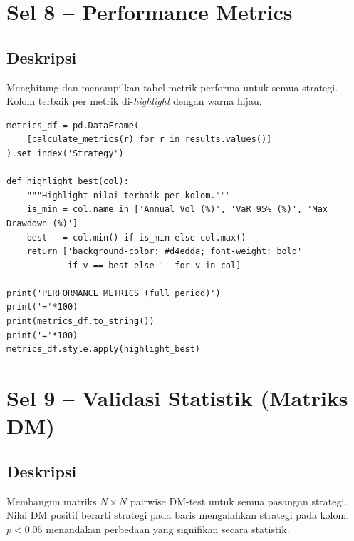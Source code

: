 \documentclass[12pt,a4paper]{article}
\begin{document}
\section{Sel 8 -- Performance Metrics}

\subsection{Deskripsi}
Menghitung dan menampilkan tabel metrik performa untuk semua strategi. Kolom
terbaik per metrik di-\textit{highlight} dengan warna hijau.

\begin{lstlisting}[caption={Tampilkan tabel metrik}]
metrics_df = pd.DataFrame(
    [calculate_metrics(r) for r in results.values()]
).set_index('Strategy')

def highlight_best(col):
    """Highlight nilai terbaik per kolom."""
    is_min = col.name in ['Annual Vol (%)', 'VaR 95% (%)', 'Max Drawdown (%)']
    best   = col.min() if is_min else col.max()
    return ['background-color: #d4edda; font-weight: bold'
            if v == best else '' for v in col]

print('PERFORMANCE METRICS (full period)')
print('='*100)
print(metrics_df.to_string())
print('='*100)
metrics_df.style.apply(highlight_best)
\end{lstlisting}

\section{Sel 9 -- Validasi Statistik (Matriks DM)}

\subsection{Deskripsi}
Membangun matriks $N \times N$ pairwise DM-test untuk semua pasangan strategi.
Nilai DM positif berarti strategi pada baris mengalahkan strategi pada kolom.
$p < 0.05$ menandakan perbedaan yang signifikan secara statistik.
\end{document}
